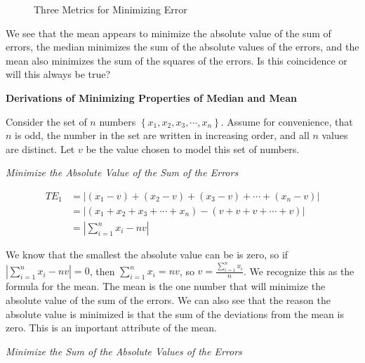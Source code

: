 \documentclass[10pt,]{book}
\theoremstyle{ptxdefinitionnotitle}
\theoremstyle{ptxdefinitiontitle}
\numberwithin{equation}{section}
\newcommand{\amp}{&}
\begin{document}
\begin{example}[{.}]
\begin{figure}
\caption{Three Metrics for Minimizing Error\label{three-metrics-for-minimizing-error}}
\end{figure}
\hypertarget{p-56}{}%
We see that the mean appears to minimize the absolute value of the sum of errors, the median minimizes the sum of the absolute values of the errors, and the mean also minimizes the sum of the squares of the errors. Is this coincidence or will this always be true? \\%
\par
\hypertarget{p-57}{}%
\noindent\textbf{Derivations of Minimizing Properties of Median and Mean}%
\par
\hypertarget{p-58}{}%
Consider the set of \(n\) numbers \(\left\{ {x_1}, {x_2}, {x_3}, \cdots, {x_n} \right\}\). Assume for convenience, that \(n\) is odd, the number in the set are written in increasing order, and all \(n\) values are distinct. Let \(v\) be the value chosen to model this set of numbers. \\%
\par
\hypertarget{p-59}{}%
\noindent \emph{Minimize the Absolute Value of the Sum of the Errors}%
\par
\hypertarget{p-60}{}%
%
\begin{align*}
T{E_1} \amp = \left| {\left( {{x_1} - v} \right) + \left( {{x_2} - v} \right) + \left( {{x_3} - v} \right) +  \cdots  + \left( {{x_n} - v} \right)} \right|\\
\amp = \left| {\left( {{x_1} + {x_2} + {x_3} +  \cdots  + {x_n}} \right) - \left( {v + v + v +  \cdots  + v} \right)} \right|\\
\amp = \left| {\sum\limits_{i = 1}^n {{x_i} - nv} } \right|
\end{align*}
%
\par
\hypertarget{p-61}{}%
We know that the smallest the absolute value can be is zero, so if \(\left| {\sum\limits_{i = 1}^n {{x_i} - nv} } \right| = 0\), then \(\sum\limits_{i = 1}^n {{x_i} = nv}\), so \(v = \frac{{\sum\limits_{i = 1}^n {{x_i}} }}{n}\). We recognize this as the formula for the mean. The mean is the one number that will minimize the absolute value of the sum of the errors. We can also see that the reason the absolute value is minimized is that the sum of the deviations from the mean is zero. This is an important attribute of the mean. \\%
\par
\hypertarget{p-62}{}%
\noindent \emph{Minimize the Sum of the Absolute Values of the Errors}%
\par
\hypertarget{p-63}{}%
%

\end{example}
\end{document}
